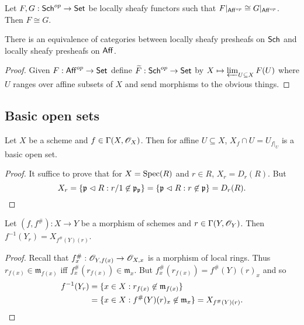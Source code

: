 \documentclass{memoir}
\begin{document}
\begin{corollary}
    Let $F,G:{\normalfont\mathsf{Sch}}^{op}\to {\normalfont\mathsf{Set}}$ be locally sheafy functors such that $F|_{{\normalfont\mathsf{Aff}}^{op}} \cong G|_{{\normalfont\mathsf{Aff}}^{op}}$.
    Then $F\cong G$.
\end{corollary}
\begin{conjecture}
    There is an equivalence of categories between locally sheafy presheafs on ${\normalfont\mathsf{Sch}}$ and locally sheafy presheafs on ${\normalfont\mathsf{Aff}}$.
\end{conjecture}
\begin{proof}
    Given $F:{\normalfont\mathsf{Aff}}^{op}\to {\normalfont\mathsf{Set}}$ define $\widetilde F:{\normalfont\mathsf{Sch}}^{op}\to {\normalfont\mathsf{Set}}$ by $X\mapsto \varprojlim_{U\subseteq X}F(U)$ where $U$ ranges over affine subsets of $X$ and send morphisms to the obvious things.
\end{proof}
\subsection{Basic open sets}
\begin{proposition}
    Let $X$ be a scheme and $f\in \Gamma(X,\mathscr{O}_X)$.
    Then for affine $U\subseteq X$, $X_f\cap U = U_{f|_U}$ is a basic open set.
\end{proposition}
\begin{proof}
    It suffice to prove that for $X=\operatorname{Spec}(R)$ and $r\in R$, $X_r = D_r(R)$.
    But
    \begin{equation}
        X_r = \lbrace\mathfrak p \vartriangleleft R : r/1 \not\in \mathfrak p_{\mathfrak p}\rbrace = \lbrace\mathfrak p \vartriangleleft R : r\not\in \mathfrak p\rbrace = D_r(R).
    \end{equation}
\end{proof}
\begin{proposition}
    Let $(f,f^\#):X\to Y$ be a morphism of schemes and $r\in \Gamma(Y,\mathscr{O}_Y)$.
    Then $f^{-1}(Y_r) = X_{f^\#(Y)(r)}$.
\end{proposition}
\begin{proof}
    Recall that $f^\#_x:\mathscr{O}_{Y,f(x)}\to \mathscr{O}_{X,x}$ is a morphism of local rings.
    Thus $r_{f(x)}\in \mathfrak m_{f(x)}$ iff $f^\#_x(r_{f(x)}) \in \mathfrak m_x$.
    But $f^\#_x(r_{f(x)}) = f^\#(Y)(r)_x$ and so
    \begin{align}
        f^{-1}(Y_r) &= \lbrace x\in X: r_{f(x)} \not\in \mathfrak m_{f(x)}\rbrace \nonumber \\
                    &= \lbrace x\in X: f^\#(Y)(r)_x \not\in \mathfrak m_x\rbrace = X_{f^\#(Y)(r)}.
    \end{align}
\end{proof}
\end{document}
